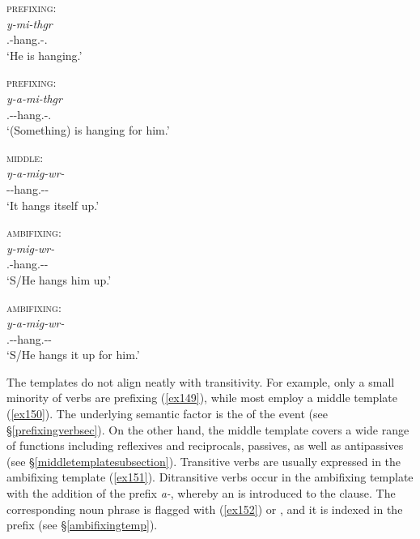 \begin{exe}
\ex
\label{ex759}
\begin{xlist}
	\ex \textsc{prefixing}:\\
	\gll \emph{y-mi-thgr}\\
	 	\Tsg.\Masc-hang.\Pos-\Stat.\Ndu\\
	\trans `He is hanging.'
	\label{ex760}

	\ex \textsc{ prefixing}:\\
	\gll \emph{y-a-mi-thgr}\\
	 	\Tsg.\Masc-\Vc-hang.\Pos-\Stat.\Ndu\\
	\trans `(Something) is hanging for him.'
	\label{ex761}

	\ex \textsc{middle}:\\
	\gll \emph{ŋ-a-mig-wr-\Zero}\\
	 	\M-\Vc-hang.\Ext-\Ndu-\Stsg\\
	\trans `It hangs itself up.'
	\label{ex762}

	\ex \textsc{ ambifixing}:\\
	\gll \emph{y-mig-wr-\Zero}\\
	 	\Tsg.\Masc-hang.\Ext-\Ndu-\Stsg\\
	\trans `S/He hangs him up.'
	\label{ex763}

	\ex \textsc{ ambifixing}:\\
	\gll \emph{y-a-mig-wr-\Zero}\\
	 	\Tsg.\Masc-\Vc-hang.\Ext-\Ndu-\Stsg\\
	\trans `S/He hangs it up for him.'
	\label{ex764}
\end{xlist}
\end{exe}

The templates do not align neatly with transitivity. For example, only a small minority of  verbs are prefixing (\ref{ex149}), while most employ a middle template (\ref{ex150}). The underlying semantic factor is the  of the event (see \S{}\ref{prefixingverbsec}). On the other hand, the middle template covers a wide range of functions including reflexives and reciprocals, passives, as well as antipassives (see \S{}\ref{middletemplatesubsection}). Transitive verbs are usually expressed in the ambifixing template (\ref{ex151}). Ditransitive verbs occur in the ambifixing template with the addition of the  prefix \emph{a-}, whereby an  is introduced to the clause. The corresponding noun phrase is flagged with  (\ref{ex152}) or  , and it is indexed in the  prefix (see \S{}\ref{ambifixingtemp}).


